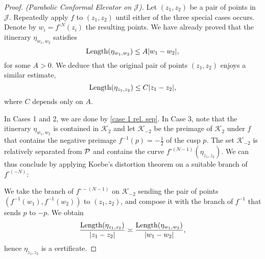 \begin{proof}[Proof. (Parabolic Conformal Elevator on $\mathcal J$)] \label{parabolic-elevator}
Let  $(z_1,z_2)$ be a pair of points in $\mathcal J$. Repeatedly apply $f$ to $(z_1, z_2)$ until either of the three special cases occurs. Denote by $w_i=f^{\circ N}(z_i)$ the resulting points. We have already proved that the itinerary $\eta_{w_1,w_2}$ satisfies
\begin{equation*}
	\operatorname{Length}(\eta_{w_1,w_2}) \leq A |w_1-w_2|,
\end{equation*}
for some $A>0$. We deduce that the original pair of points $(z_1,z_2)$ enjoys a similar estimate,
\begin{equation*}
	\operatorname{Length}(\eta_{z_1,z_2}) \leq C |z_1-z_2|,
\end{equation*}
where $C$ depends only on $A$.

In Cases 1 and 2, we are done by \cref{case 1 rel. sep}. In Case 3, note that
the itinerary $\eta_{w_1,w_2}$ is contained in $\mathcal K_2$ and let $\mathcal K_{-2}$ be the preimage of $\mathcal K_2$ under $f$ that contains the negative preimage $f^{-1}(p)=-\tfrac 12$ of the cusp $p$. The set $\mathcal K_{-2}$ is relatively separated from $\operatorname{\mathcal P}$ and contains the curve $f^{\circ (N-1)}(\eta_{z_1,z_2})$.
We can thus conclude by applying Koebe's distortion theorem on a suitable branch of $f^{\circ (-N)}$:

We take the branch of $f^{\circ -(N-1)}$ on $\mathcal K_{-2}$ sending the pair of points $(f^{-1}(w_1),f^{-1}(w_2))$ to $(z_1,z_2)$, and compose it with the branch of $f^{-1}$ that sends $p$ to $-p$. We obtain
\begin{equation}
	\frac{\operatorname{Length}(\eta_{z_1,z_2})}{|z_1-z_2|} \asymp \frac{\operatorname{Length}(\eta_{w_1,w_2})}{|w_1-w_2|},
\end{equation}
hence $\eta_{z_1,z_2}$ is a certificate.
\end{proof}


